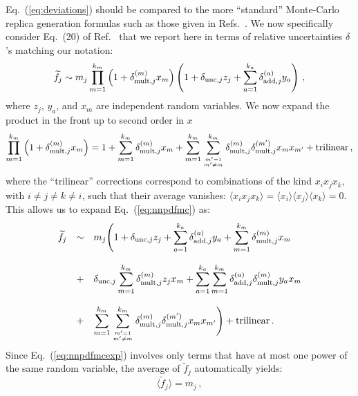 \documentclass[10pt,a4paper]{article}
\begin{document}
Eq.~(\ref{eq:deviations}) should be compared to the more ``standard''
Monte-Carlo replica generation formulas such as those given in
Refs.~\cite{Ball:2008by, Ball:2014uwa}. We now specifically consider
Eq.~(20) of Ref.~\cite{Ball:2014uwa} that we report here in terms of
relative uncertainties $\delta$'s matching our notation:
\begin{equation}\label{eq:nnpdfmc}
\widetilde{f}_j\sim m_j\prod_{m=1}^{k_m}\left(1+\delta_{{\rm mult},j}^{(m)} x_m\right)\left(1+\delta_{{\rm unc},j} z_j+\sum_{a=1}^{k_a} \delta_{{\rm add},j}^{(a)} y_a\right)\,,
\end{equation}
where $z_j$, $y_a$, and $x_m$ are independent random variables. We now
expand the product in the front up to second order in $x$
\begin{equation}
  \prod_{m=1}^{k_m}\left(1+\delta_{{\rm mult},j}^{(m)}
    x_m\right)=1+\sum_{m=1}^{k_m}\delta_{{\rm mult},j}^{(m)}
  x_m+\sum_{m=1}^{k_m}\sum_{m'=1\atop m'\neq m}^{k_m}\delta_{{\rm
      mult},j}^{(m)}\delta_{{\rm mult},j}^{(m')}x_m x_{m'}+\mbox{trilinear}\,,
\end{equation}
where the ``trilinear'' corrections correspond to combinations of the
kind $x_ix_jx_k$, with $i\neq j\neq k\neq i$, such that their average
vanishes:
$\langle x_ix_jx_k\rangle = \langle x_i\rangle \langle x_j
\rangle\langle x_k\rangle = 0$. This allows us to expand
Eq.~(\ref{eq:nnpdfmc}) as:
\begin{equation}\label{eq:nnpdfmcexp}
\begin{array}{rcl}
\widetilde{f}_j&\sim&\displaystyle m_j\Bigg(1+\delta_{{\rm unc},j} z_j+\sum_{a=1}^{k_a} \delta_{{\rm add},j}^{(a)} y_a +\sum_{m=1}^{k_m}\delta_{{\rm mult},j}^{(m)}
  x_m\\
\\
&+&\displaystyle\delta_{{\rm unc},j} \sum_{m=1}^{k_m} \delta_{{\rm mult},j}^{(m)}
    z_jx_m+\sum_{a=1}^{k_a} \sum_{m=1}^{k_m}\delta_{{\rm add},j}^{(a)} \delta_{{\rm mult},j}^{(m)} y_a 
  x_m\\
\\
&+&\displaystyle \sum_{m=1}^{k_m}\sum_{m'=1\atop m'\neq m}^{k_m}\delta_{{\rm
      mult},j}^{(m)}\delta_{{\rm mult},j}^{(m')}x_m x_{m'}\Bigg)+\mbox{trilinear}\,.
\end{array}
\end{equation}
Since Eq.~(\ref{eq:nnpdfmcexp}) involves only terms that have at most
one power of the same random variable, the average of
$\widetilde{f}_j$ automatically yields:
\begin{equation}\label{eq:centralvaluenn}
  \langle \widetilde {f}_j\rangle = m_j\,,
\end{equation}
\end{document}
